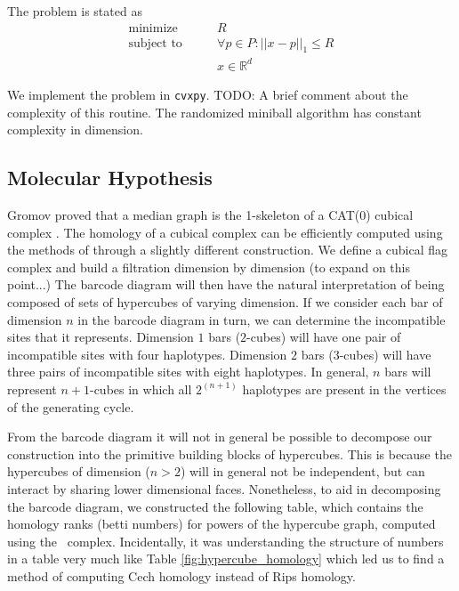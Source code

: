 The problem is stated as
\begin{align*}
\text{minimize}\qquad   &  R \\
\text{subject to}\qquad & \forall p \in P: ||x-p||_{1} \leq R \\
                        & x \in \mathbb{R}^d
\end{align*}

We implement the problem in \texttt{cvxpy}.
TODO: A brief comment about the complexity of this routine.
The randomized miniball algorithm has constant complexity in dimension.

\subsection{Molecular Hypothesis}

Gromov proved that a median graph is the 1-skeleton of a CAT(0) cubical complex \citep{Gromov:1987}.
The homology of a cubical complex can be efficiently computed using the methods of \citet{Kaczynski:2004} through a slightly different construction.
We define a cubical flag complex and build a filtration dimension by dimension (to expand on this point...)
The barcode diagram will then have the natural interpretation of being composed of sets of hypercubes of varying dimension.
If we consider each bar of dimension $n$ in the barcode diagram in turn, we can determine the incompatible sites that it represents.
Dimension $1$ bars ($2$-cubes) will have one pair of incompatible sites with four haplotypes.
Dimension $2$ bars ($3$-cubes) will have three pairs of incompatible sites with eight haplotypes.
In general, $n$ bars will represent $n+1$-cubes in which all $2^{(n+1)}$ haplotypes are present in the vertices of the generating cycle.

From the barcode diagram it will not in general be possible to decompose our construction into the primitive building blocks of hypercubes.
This is because the hypercubes of dimension ($n>2$) will in general not be independent, but can interact by sharing lower dimensional faces.
Nonetheless, to aid in decomposing the barcode diagram, we constructed the following table, which contains the homology ranks (betti numbers) for powers of the hypercube graph, computed using the \Cech\ complex.
Incidentally, it was understanding the structure of numbers in a table very much like Table \ref{fig:hypercube_homology} which led us to find a method of computing Cech homology instead of Rips homology.

